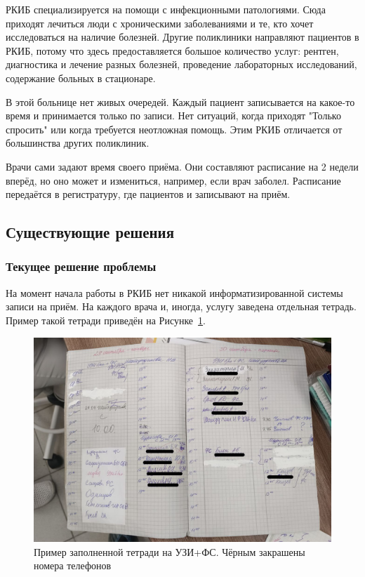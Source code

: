 \documentclass[a4paper,article]{article}
\begin{document}
        РКИБ специализируется на помощи с инфекционными патологиями. Сюда приходят лечиться люди с хроническими заболеваниями и те, кто хочет исследоваться на наличие болезней. Другие поликлиники направляют пациентов в РКИБ, потому что здесь предоставляется большое количество услуг: рентген, диагностика и лечение разных болезней, проведение лабораторных исследований, содержание больных в стационаре.

        В этой больнице нет живых очередей. Каждый пациент записывается на какое-то время и принимается только по записи. Нет ситуаций, когда приходят "Только спросить" или когда требуется неотложная помощь. Этим РКИБ отличается от большинства других поликлиник.

        Врачи сами задают время своего приёма. Они составляют расписание на 2 недели вперёд, но оно может и измениться, например, если врач заболел. Расписание передаётся в регистратуру, где пациентов и записывают на приём.

    \subsection{Существующие решения}

    \subsubsection{Текущее решение проблемы}\label{Текущее решение проблемы}

        На момент начала работы в РКИБ нет никакой информатизированной системы записи на приём. На каждого врача и, иногда, услугу заведена отдельная тетрадь. Пример такой тетради приведён на Рисунке~\ref{fig:Тетрадь на УЗИ+ФС}.

        \begin{figure}[h]

            \centering

            \includegraphics[width=0.8\linewidth]{Пример заполненной тетради на УЗИ+ФС. Чёрным закрашены номера телефонов.png}

            \caption{\centering Пример заполненной тетради на УЗИ+ФС. Чёрным закрашены номера телефонов}

            \label{fig:Тетрадь на УЗИ+ФС}

        \end{figure}
\end{document}
